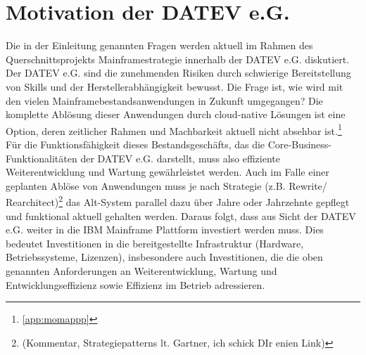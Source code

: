 \chapter{Motivation der DATEV e.G.}\label{ch:Firmenkontext}
Die in der Einleitung genannten Fragen werden aktuell im Rahmen des Querschnittsprojekts \glqq Mainframestrategie\grqq{} innerhalb der DATEV e.G. diskutiert. 
Der DATEV e.G. sind die zunehmenden Risiken durch schwierige Bereitstellung von Skills und der Herstellerabhängigkeit bewusst. 
Die Frage ist, wie wird mit den vielen Mainframebestandsanwendungen in Zukunft umgegangen?
Die komplette Ablösung dieser Anwendungen durch cloud-native Lösungen ist eine Option, deren zeitlicher Rahmen und Machbarkeit aktuell nicht absehbar ist.\footnote{\ref{app:momappp} }
Für die Funktionsfähigkeit dieses Bestandsgeschäfts, das die Core-Business-Funktionalitäten der DATEV e.G. darstellt, muss also effiziente Weiterentwicklung und Wartung gewährleistet werden.
Auch im Falle einer geplanten Ablöse von Anwendungen muss je nach Strategie (z.B. \glqq Rewrite\grqq / \glqq Rearchitect\grqq)\footnote{(Kommentar, Strategiepatterns lt. Gartner, ich schick DIr enien Link)} das Alt-System parallel dazu über Jahre oder Jahrzehnte gepflegt und funktional aktuell gehalten werden.
Daraus folgt, dass aus Sicht der DATEV e.G. weiter in die IBM Mainframe Plattform investiert werden muss. 
Dies bedeutet Investitionen in die bereitgestellte Infrastruktur (Hardware, Betriebssysteme, Lizenzen), insbesondere auch Investitionen, die die oben genannten Anforderungen an Weiterentwicklung, Wartung und Entwicklungseffizienz sowie Effizienz im Betrieb adressieren.

